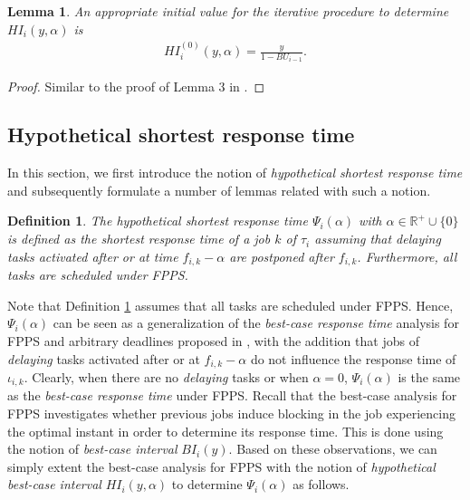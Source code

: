 \documentclass[fleqn]{article}
\newtheorem{lemma}{Lemma}
\newtheorem{definition}{Definition}
\begin{document}
\begin{lemma}
	An appropriate initial value for the iterative procedure to determine $HI_i(y,\alpha)$ is
	\begin{align}
	HI_i^{(0)}(y,\alpha) = \frac{y}{1-BU_{i-1}}.
	\end{align}
\end{lemma}

\begin{proof}
	Similar to the proof of Lemma 3 in \cite{BLM13}.
\end{proof}

\subsection{Hypothetical shortest response time}
In this section, we first introduce the notion of \textit{hypothetical shortest response time} and subsequently formulate a number of lemmas related with such a notion.

\begin{definition} \label{def:hsrt_def}
The \textit{hypothetical shortest response time} $\Psi_i(\alpha)$ with $\alpha \in \mathbb{R^+} \cup \{0\}$ is defined as the shortest response time of a job $k$ of $\tau_i$ assuming that delaying tasks activated after or at time $f_{i,k}-\alpha$ are postponed after $f_{i,k}$. Furthermore, all tasks are scheduled under FPPS.
\end{definition}

Note that Definition \ref{def:hsrt_def} assumes that all tasks are scheduled under FPPS. Hence, $\Psi_i(\alpha)$ can be seen as a generalization of the \textit{best-case response time} analysis for FPPS and arbitrary deadlines proposed in \cite{BLM13}, with the addition that jobs of \textit{delaying} tasks activated after or at $f_{i,k}-\alpha$ do not influence the response time of $\iota_{i,k}$. Clearly, when there are no \textit{delaying} tasks or when $\alpha = 0$, $\Psi_i(\alpha)$ is the same as the \textit{best-case response time} under FPPS. Recall that the best-case analysis for FPPS investigates whether previous jobs induce blocking in the job experiencing the optimal instant in order to determine its response time. This is done using the notion of \textit{best-case interval} $BI_i(y)$. Based on these observations, we can simply extent the best-case analysis for FPPS with the notion of \textit{hypothetical best-case interval} $HI_i(y,\alpha)$ to determine $\Psi_i(\alpha)$ as follows.
\end{document}
